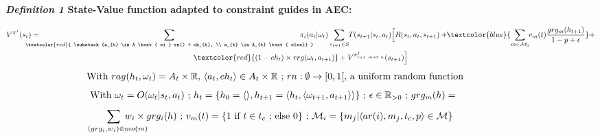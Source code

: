 \begin{figure}[h]
    \label{eq:single_value_function}
    \raggedright
    \textbf{\textit{Definition 1} \quad State-Value function adapted to constraint guides in AEC:}

    \begin{scriptsize}
        \vspace{-0.6cm}
        \begin{gather*}
            V^{\pi^j}(s_t) = \hspace{-0.75cm}
            \sum_{\textcolor{red}{ \substack{a_{t} \in A \text{ si } rn() < ch_{t}, \\
                        a_{t} \in A_{t} \text{ else}}
                }}{\hspace{-0.7cm} \pi_i(a_{t} | \omega_t)}
            \sum_{s_{t+1} \in S}
            {\hspace{-0.1cm} T(s_{t+1} | s_t, a_{t})
            \Bigl[R(s_t,a_{t},s_{t+1}) + \hspace{-0.1cm}
            \textcolor{blue}{ \sum_{m \in \mathcal{M}_i}{ \hspace{-0.1cm} v_m(t) \frac{grg_m(h_{t+1})}{1 - p + \epsilon} } }
            + } \\
            {\textcolor{red}{(1-ch_t) \times rrg(\omega_t,a_{t+1})} + V^{\pi^j_{i+1 \ mod \ n}}(s_{t+1})\Bigr]}
        \end{gather*}
        \vspace{-0.5cm}
        \textcolor{red}{\[\text{ \hspace{-0.1cm} With } rag(h_t, \omega_t) = A_{t} \times \mathbb{R} \text{, } \langle a_t, ch_{t} \rangle \in A_{t} \times \mathbb{R} \text{~; } rn: \emptyset \to [0,1[ \text{, a uniform random function}\]}
        \vspace{-0.6cm}
        \textcolor{blue}{
            \begin{gather*}
                \hspace{-0.001cm}
                \text{With } \omega_t = O(\omega_t | s_t, a_t) \text{~; } h_t = \{h_0 = \langle \rangle, h_{t+1} = \langle h_t, \langle \omega_{t+1}, a_{t+1} \rangle \rangle \} \text{~; } \epsilon \in \mathbb{R}_{>0} \text{~; } grg_m(h) =
            \end{gather*}
        }
        \vspace{-0.95cm}
        \textcolor{blue}{
            \begin{gather*}
                \hspace{-0.5cm} \sum_{\hspace{0.3cm}(grg_i,w_i) \in mo(m)}{\hspace{-0.9cm} w_i \times grg_i(h)}
                \text{~; } v_m(t) = \{ 1 \text{ if } t \in t_c \text{~; else } 0 \} \text{~; } \mathcal{M}_i = \{m_j | \langle ar(i),m_j,t_c,p \rangle \in \mathcal{M}\}
            \end{gather*}
        }
        \vspace{-0.6cm}
    \end{scriptsize}

\end{figure}

